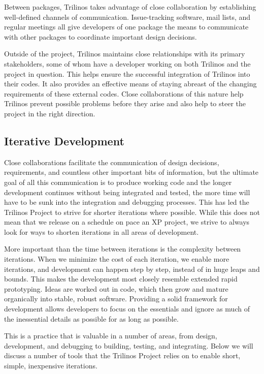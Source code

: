 \documentclass[12pt,relax]{article}
\begin{document}
Between packages, Trilinos takes advantage of close collaboration by 
establishing well-defined channels of communication.  Issue-tracking
software, mail lists, and regular meetings all give developers of one package
the means to communicate with other packages to coordinate important design
decisions.

Outside of the project, Trilinos maintains close relationships with its primary
stakeholders, some of whom have a developer working on both Trilinos and the
project in question.  This helps ensure the successful integration of Trilinos
into their codes.  It also provides an effective means of staying abreast of
the changing requirements of these external codes.  Close collaborations of
this nature help Trilinos prevent possible problems before they arise and also
help to steer the project in the right direction.

\subsection{Iterative Development}

Close collaborations facilitate the communication of design decisions, 
requirements, and countless other important bits of information, but the
ultimate goal of all this communication is to produce working code and the
longer development continues without being integrated and tested, the more
time will have to be sunk into the integration and debugging processes.  This
has led the Trilinos Project to strive for shorter iterations where possible.
While this does not mean that we release on a schedule on pace an XP
project, we strive to always look for ways to shorten iterations in all areas
of development.

More important than the time between iterations is the complexity between
iterations.  When we minimize the cost of each iteration, we enable more
iterations, and development can happen step by step, instead of in huge leaps
and bounds.  This makes the development most closely resemble extended
rapid prototyping.  Ideas are worked out in code, which then grow and mature
organically into stable, robust software.  Providing a solid framework for
development allows developers to focus on the essentials and ignore as much of
the inessential details as possible for as long as possible.

This is a practice that is valuable in a number of areas, from design,
development, and debugging to building, testing, and integrating.  Below we
will discuss a number of tools that the Trilinos Project relies on to enable
short, simple, inexpensive iterations.
\end{document}
